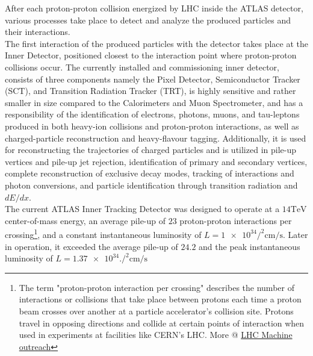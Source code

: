 After each proton-proton collision energized by LHC inside the ATLAS detector, various processes take place to detect and analyze the produced particles and their interactions.\\
The first interaction of the produced particles with the detector takes place at the Inner Detector, positioned closest to the interaction point where proton-proton collisions occur. The currently installed and commissioning inner detector, consists of three components namely the Pixel Detector, Semiconductor Tracker (SCT), and Transition Radiation Tracker (TRT), is highly sensitive and rather smaller in size compared to the Calorimeters and Muon Spectrometer, and has a responsibility of the identification of electrons, photons, muons, and tau-leptons produced in both heavy-ion collisions and proton-proton interactions, as well as charged-particle reconstruction and heavy-flavour tagging. Additionally, it is used for reconstructing the trajectories of charged particles and is utilized in pile-up vertices and pile-up jet rejection, identification of primary and secondary vertices, complete reconstruction of exclusive decay modes, tracking of interactions and photon conversions, and particle identification through transition radiation and $dE/dx$. \\
The current ATLAS Inner Tracking Detector was designed to operate at a $14  \si{\tera\eV}$ center-of-mass energy, an average pile-up of $23$ proton-proton interactions per crossing\footnote{The term "proton-proton interaction per crossing" describes the number of interactions or collisions that take place between protons each time a proton beam crosses over another at a particle accelerator's collision site. Protons travel in opposing directions and collide at certain points of interaction when used in experiments at facilities like CERN's LHC. More @ \href{https://lhc-machine-outreach.web.cern.ch/collisions.htm}{LHC Machine outreach}}, and a constant instantaneous luminosity of $L = \num{1e34} \si{\square\per\centi\meter\per\second}$. Later in operation, it exceeded the average pile-up of $24.2$ and the peak instantaneous luminosity of $L = \num{1.37e34}. \si{\square\per\centi\meter\per\second}$\cite{Collaboration:390920}

